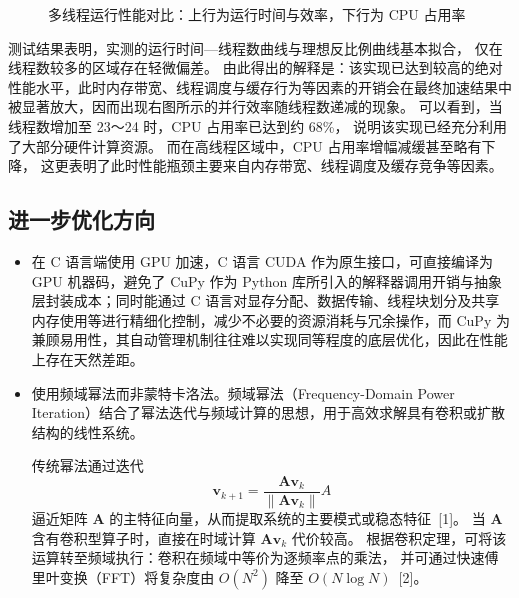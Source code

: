 \documentclass[a4paper,12pt]{article}
\begin{document}
\begin{CJK}{UTF8}{gbsn}
\begin{figure}[H]
		\vspace{1em} %

		\begin{minipage}[t]{0.48\textwidth}
			\centering
		\end{minipage}

		\caption{多线程运行性能对比：上行为运行时间与效率，下行为 CPU 占用率}
		\label{fig:thread_perf}
	\end{figure}


	测试结果表明，实测的运行时间—线程数曲线与理想反比例曲线基本拟合，
	仅在线程数较多的区域存在轻微偏差。
	由此得出的解释是：该实现已达到较高的绝对性能水平，此时内存带宽、线程调度与缓存行为等因素的开销会在最终加速结果中被显著放大，因而出现右图所示的并行效率随线程数递减的现象。
	可以看到，当线程数增加至 23～24 时，CPU 占用率已达到约 68\%，
	说明该实现已经充分利用了大部分硬件计算资源。
	而在高线程区域中，CPU 占用率增幅减缓甚至略有下降，
	这更表明了此时性能瓶颈主要来自内存带宽、线程调度及缓存竞争等因素。


	\subsection{进一步优化方向}
	\begin{itemize}
		\item 在 C 语言端使用 GPU 加速，C 语言 CUDA 作为原生接口，可直接编译为 GPU 机器码，避免了 CuPy 作为 Python 库所引入的解释器调用开销与抽象层封装成本；同时能通过 C 语言对显存分配、数据传输、线程块划分及共享内存使用等进行精细化控制，减少不必要的资源消耗与冗余操作，而 CuPy 为兼顾易用性，其自动管理机制往往难以实现同等程度的底层优化，因此在性能上存在天然差距。

		\item 使用频域幂法而非蒙特卡洛法。频域幂法（Frequency-Domain Power Iteration）结合了幂法迭代与频域计算的思想，用于高效求解具有卷积或扩散结构的线性系统。

		      传统幂法通过迭代
		      \[
			      \mathbf{v}_{k+1} = \frac{\mathbf{A}\mathbf{v}_k}{\|\mathbf{A}\mathbf{v}_k\|}
			      A			\]
		      逼近矩阵 $\mathbf{A}$ 的主特征向量，从而提取系统的主要模式或稳态特征~[1]。
		      当 $\mathbf{A}$ 含有卷积型算子时，直接在时域计算 $\mathbf{A}\mathbf{v}_k$ 代价较高。
		      根据卷积定理，可将该运算转至频域执行：卷积在频域中等价为逐频率点的乘法，
		      并可通过快速傅里叶变换（FFT）将复杂度由 $O(N^2)$ 降至 $O(N\log N)$~[2]。


\end{itemize}
\end{CJK}
\end{document}
